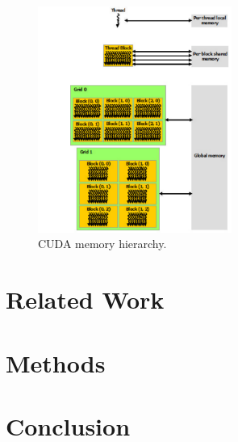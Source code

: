 \documentclass[conference]{IEEEtran}
\begin{document}
\begin{figure}[!t]
\centering
\includegraphics[width=2.5in]{memory-hierarchy}
\caption{CUDA memory hierarchy.}
\label{fig:memoryhierarchy}
\end{figure}
\section{Related Work}
\label{sec:relatedwork}

\section{Methods}
\label{sec:method}

\section{Conclusion}
\label{sec:clonclusion}




\end{document}

